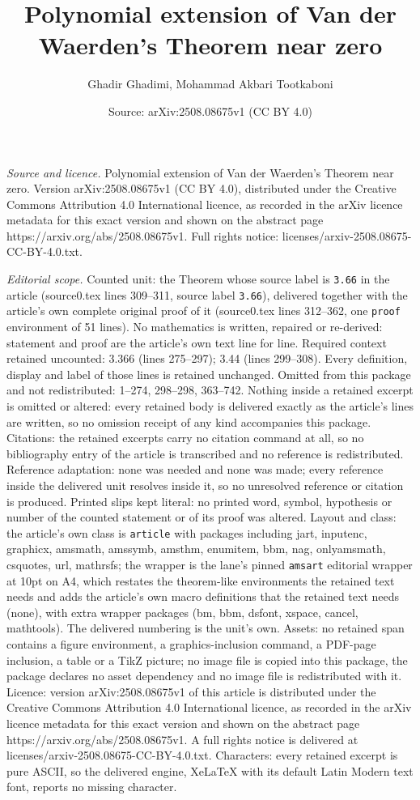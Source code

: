 \documentclass[10pt,a4paper]{amsart}
\title[Polynomial extension of Van der Waerden's Theorem near zero]{Polynomial extension of Van der Waerden's Theorem near zero}
\author{Ghadir Ghadimi, Mohammad Akbari Tootkaboni}
\date{Source: arXiv:2508.08675v1 (CC BY 4.0)}
\begin{document}
\maketitle

\noindent\emph{Source and licence.} Polynomial extension of Van der Waerden's Theorem near zero. Version arXiv:2508.08675v1 (CC BY 4.0), distributed under the Creative Commons Attribution 4.0 International licence, as recorded in the arXiv licence metadata for this exact version and shown on the abstract page https://arxiv.org/abs/2508.08675v1. Full rights notice: licenses/arxiv-2508.08675-CC-BY-4.0.txt.\par\smallskip

\noindent\textit{Editorial scope.} Counted unit: the Theorem whose source label is \texttt{3.66} in the article (source0.tex lines 309--311, source label \texttt{3.66}), delivered together with the article's own complete original proof of it (source0.tex lines 312--362, one \texttt{proof} environment of 51 lines). No mathematics is written, repaired or re-derived: statement and proof are the article's own text line for line. Required context retained uncounted: 3.366 (lines 275--297); 3.44 (lines 299--308). Every definition, display and label of those lines is retained unchanged. Omitted from this package and not redistributed: 1--274, 298--298, 363--742. Nothing inside a retained excerpt is omitted or altered: every retained body is delivered exactly as the article's lines are written, so no omission receipt of any kind accompanies this package. Citations: the retained excerpts carry no citation command at all, so no bibliography entry of the article is transcribed and no reference is redistributed. Reference adaptation: none was needed and none was made; every reference inside the delivered unit resolves inside it, so no unresolved reference or citation is produced. Printed slips kept literal: no printed word, symbol, hypothesis or number of the counted statement or of its proof was altered. Layout and class: the article's own class is \texttt{article} with packages including jart, inputenc, graphicx, amsmath, amssymb, amsthm, enumitem, bbm, nag, onlyamsmath, csquotes, url, mathrsfs; the wrapper is the lane's pinned \texttt{amsart} editorial wrapper at 10pt on A4, which restates the theorem-like environments the retained text needs and adds the article's own macro definitions that the retained text needs (none), with extra wrapper packages (bm, bbm, dsfont, xspace, cancel, mathtools). The delivered numbering is the unit's own. Assets: no retained span contains a figure environment, a graphics-inclusion command, a PDF-page inclusion, a table or a TikZ picture; no image file is copied into this package, the package declares no asset dependency and no image file is redistributed with it. Licence: version arXiv:2508.08675v1 of this article is distributed under the Creative Commons Attribution 4.0 International licence, as recorded in the arXiv licence metadata for this exact version and shown on the abstract page https://arxiv.org/abs/2508.08675v1. A full rights notice is delivered at licenses/arxiv-2508.08675-CC-BY-4.0.txt. Characters: every retained excerpt is pure ASCII, so the delivered engine, XeLaTeX with its default Latin Modern text font, reports no missing character.
\end{document}
